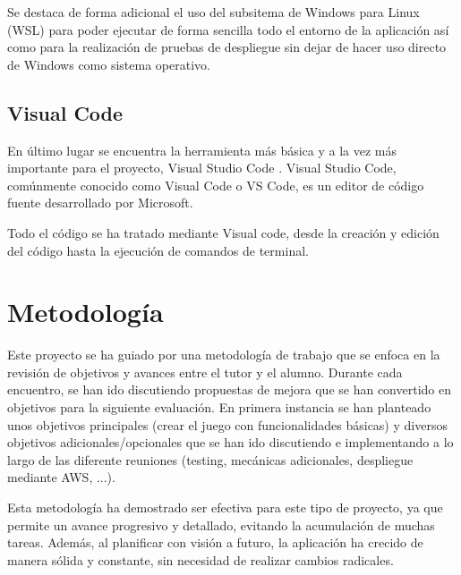 Se destaca de forma adicional el uso del subsitema de Windows para Linux (WSL) \cite{wsl} para poder ejecutar de forma sencilla
todo el entorno de la aplicación así como para la realización de pruebas de despliegue sin dejar de hacer uso directo de Windows
como sistema operativo.

\subsection{Visual Code}

En último lugar se encuentra la herramienta más básica y a la vez más importante para
el proyecto, Visual Studio Code \cite{vscode}. Visual Studio Code, comúnmente conocido como Visual Code o VS Code,
es un editor de código fuente desarrollado por Microsoft.

Todo el código se ha tratado mediante Visual code, desde la creación y edición del código hasta la ejecución de comandos
de terminal.


\section{Metodología}

Este proyecto se ha guiado por una metodología de trabajo que se enfoca en la revisión de objetivos y
avances entre el tutor y el alumno. Durante cada encuentro, se han ido discutiendo propuestas de mejora que se han convertido en
objetivos para la siguiente evaluación. En primera instancia se han planteado unos objetivos principales (crear el juego
con funcionalidades básicas) y diversos objetivos adicionales/opcionales que se han ido discutiendo e
implementando a lo largo de las diferente reuniones (testing, mecánicas adicionales, despliegue mediante AWS, ...).

Esta metodología ha demostrado ser efectiva para este tipo de proyecto, ya que permite un avance progresivo y detallado,
evitando la acumulación de muchas tareas. Además, al planificar con visión a futuro, la aplicación ha crecido de manera sólida
y constante, sin necesidad de realizar cambios radicales.
